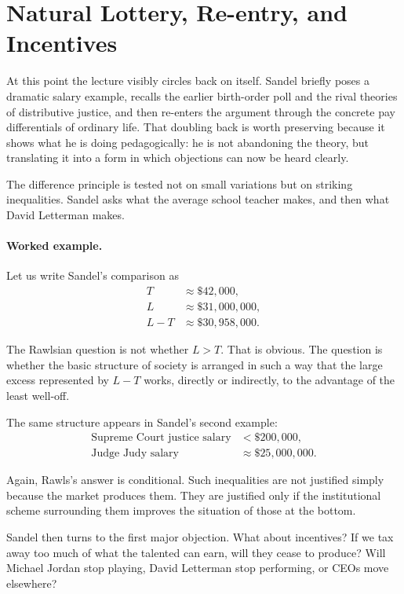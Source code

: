 \section{Natural Lottery, Re-entry, and Incentives}

At this point the lecture visibly circles back on itself. Sandel briefly poses a dramatic salary example, recalls the earlier birth-order poll and the rival theories of distributive justice, and then re-enters the argument through the concrete pay differentials of ordinary life. That doubling back is worth preserving because it shows what he is doing pedagogically: he is not abandoning the theory, but translating it into a form in which objections can now be heard clearly.

The difference principle is tested not on small variations but on striking inequalities. Sandel asks what the average school teacher makes, and then what David Letterman makes.

\paragraph{Worked example.} Let us write Sandel's comparison as
\begin{align}
T &\approx \$42{,}000,\\
L &\approx \$31{,}000{,}000,\\
L-T &\approx \$30{,}958{,}000.
\end{align}

The Rawlsian question is not whether \(L>T\). That is obvious. The question is whether the basic structure of society is arranged in such a way that the large excess represented by \(L-T\) works, directly or indirectly, to the advantage of the least well-off.

The same structure appears in Sandel's second example:
\begin{align}
\text{Supreme Court justice salary} &< \$200{,}000,\\
\text{Judge Judy salary} &\approx \$25{,}000{,}000.
\end{align}

Again, Rawls's answer is conditional. Such inequalities are not justified simply because the market produces them. They are justified only if the institutional scheme surrounding them improves the situation of those at the bottom.

Sandel then turns to the first major objection. What about incentives? If we tax away too much of what the talented can earn, will they cease to produce? Will Michael Jordan stop playing, David Letterman stop performing, or CEOs move elsewhere?

